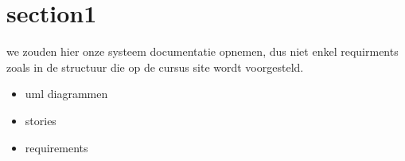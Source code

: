 \section{section1}

\begin{tcolorbox}[colback=yellow!30]
  we zouden hier onze systeem documentatie opnemen, dus niet enkel requirments
  zoals in de structuur die op de cursus site wordt voorgesteld.
  \begin{itemize}
  	\item uml diagrammen
  	\item stories
  	\item requirements
  \end{itemize}
\end{tcolorbox}


